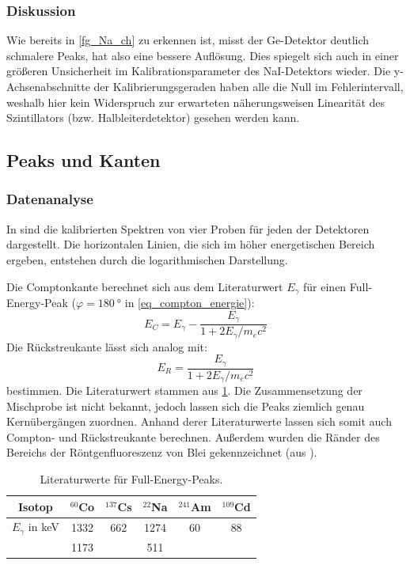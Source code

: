 \documentclass[
	a4paper,
	12pt,
	pagesize,
	ngerman
]{scrartcl}
\begin{document}
\subsubsection{Diskussion}

Wie bereits in \cref{fg_Na_ch} zu erkennen ist, misst der Ge-Detektor deutlich schmalere Peaks, hat also eine bessere Auflösung.
Dies spiegelt sich auch in einer größeren Unsicherheit im Kalibrationsparameter des NaI-Detektors wieder.
Die y-Achsenabschnitte der Kalibrierungsgeraden haben alle die Null im Fehlerintervall, weshalb hier kein Widerspruch zur erwarteten näherungsweisen Linearität des Szintillators (bzw. Halbleiterdetektor) gesehen werden kann.

\subsection{Peaks und Kanten}
\subsubsection{Datenanalyse}
In  sind die kalibrierten Spektren von vier Proben für jeden der Detektoren dargestellt.
Die horizontalen Linien, die sich im höher energetischen Bereich ergeben, entstehen durch die logarithmischen Darstellung.

Die Comptonkante berechnet sich aus dem Literaturwert $E_\gamma$ für einen Full-Energy-Peak ($\varphi=\SI{180}{\degree}$ in \cref{eq_compton_energie}):
\begin{equation}
	E_C = E_\gamma - \frac{E_\gamma }{1+2E_\gamma/m_ec^2}
\end{equation}
Die Rückstreukante lässt sich analog mit:
\begin{equation}
	E_R =  \frac{E_\gamma}{1+2E_\gamma/m_ec^2}
\end{equation}
bestimmen.
Die Literaturwert stammen aus \cref{tb_lit_peaks}.
	Die Zusammensetzung der Mischprobe ist nicht bekannt, jedoch lassen sich die Peaks ziemlich genau Kernübergängen zuordnen.
	Anhand derer Literaturwerte lassen sich somit auch Compton- und Rückstreukante berechnen.
Außerdem wurden die Ränder des Bereichs der Röntgenfluoreszenz von Blei gekennzeichnet (aus \cite{XRAYDB}).

\begin{table}[H]
		\centering
		\begin{tabular}{c | c | c | c | c | c}
			 Isotop& $^{60}$Co & $^{137}$Cs& $^{22}$Na & $^{241}$Am & $^{109}$Cd \\ \hline
			 $E_\gamma$ in \si{keV} & \SI{1332}{}&\SI{662}{}& \SI{1274}{} &\SI{60}{}&\SI{88}{} \\
			 & \SI{1173}{} &&\SI{511}{}& \\
		\end{tabular}
		\caption{
		Literaturwerte für Full-Energy-Peaks.\cite{Anleitung}
		}
		\label{tb_lit_peaks}
\end{table}
\end{document}
